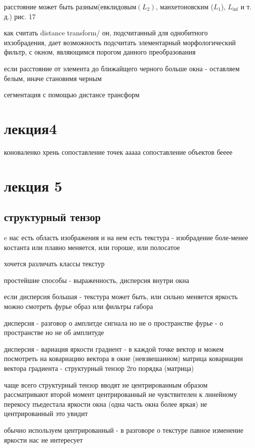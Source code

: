 \documentclass[]{report}
\begin{document}
расстояние может быть разным(евклидовым$(L_2)$, манхетоновским ($L_1$), $L_{\inf}$ и т. д.)
рис. 17

как считать distance transform/
он, подсчитанный для однобитного ихзобрадения, дает возможность подсчитать элементарный морфологический фильтр, с окном, являющимся порогом данного преобразования


если расстояние от элемента до ближайщего черного больше окна - оставляем белым, иначе становимя черным

сегментация с помощью дистансе трансформ


\chapter{лекция4}

коноваленко
хрень
сопоставление точек
ааааа
сопоставление объектов
бееее

\chapter{лекция 5}

\section{структурный тензор}

e нас есть область изображения и на нем есть текстура - 
изобрадение боле-менее костанта или плавно меняется, или гороше, или полосатое

хочется различать классы текстур

простейшие способы - выраженность, дисперсия внутри окна

если дисперсия большая - текстура может быть, или сильно меняется яркость
можно смотреть фурье образ или фильтры габора

дисперсия - разговор о амплитде сигнала но не о пространстве
фурье - о пространстве но не об амплитуде

дисперсия - вариация яркости
градиент - в каждой точке вектор и можем посмотреть на ковариацию вектора в окне (невзвешанном)
матрица ковариации вектора градиента - структурный тензор 2го порядка (матрица)

чаще всего структурный тензор вводят не центрированным образом
рассматривают второй момент
центрированный не чувствителен к линейному перекосу пъедестала яркости окна (одна часть окна более яркая)
не центрированный это увидит

обычно используем центрированный - в разговоре о текстуре павное изменение яркости нас не интересует
\end{document}
